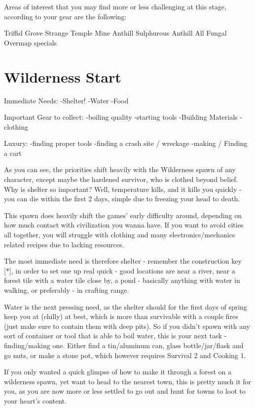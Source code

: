 \documentclass[11pt]{report}
\begin{document}
Areas of interest that you may find more or less challenging at this stage, according to your gear are the following:

Triffid Grove
Strange Temple
Mine
Anthill
Sulphurous Anthill
All Fungal Overmap specials

\section{Wilderness Start}

Immediate Needs:
	-Shelter!
	-Water
	-Food

Important Gear to collect:
	-boiling quality
	-starting tools
	-Building Materials
	-clothing

Luxury:
	-finding proper tools
	-finding a crash site / wreckage
	-making / Finding a cart

As you can see, the priorities shift heavily with the Wilderness spawn of any character, except maybe the hardened survivor, who is clothed beyond belief. Why is shelter so important? Well, temperature kills, and it kills you quickly - you can die within the first 2 days, simple due to freezing your head to death.

This spawn does heavily shift the games' early difficulty around, depending on how much contact with civilization you wanna have. If you want to avoid cities all together, you will struggle with clothing and many electronics/mechanics related recipes due to lacking resources.

The most immediate need is therefore shelter - remember the construction key [*], in order to set one up real quick - good locations are near a river, near a forest tile with a water tile close by, a pond - basically anything with water in walking, or preferably - in crafting range.

Water is the next pressing need, as the shelter should for the first days of spring keep you at (chilly) at best, which is more than survivable with a couple fires (just make sure to contain them with deep pits). So if you didn't spawn with any sort of container or tool that is able to boil water, this is your next task - finding/making one. Either find a tin/aluminum can, glass bottle/jar/flask and go nuts, or make a stone pot, which however requires Survival 2 and Cooking 1.

If you only wanted a quick glimpse of how to make it through a forest on a wilderness spawn, yet want to head to the nearest town, this is pretty much it for you, as you are now more or less settled to go out and hunt for towns to loot to your heart's content.
\end{document}
